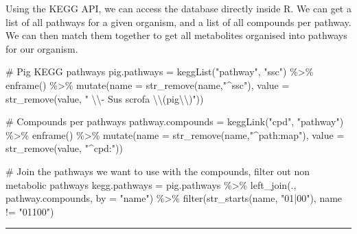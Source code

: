 \documentclass[
  24px,
  letterpaper,
  DIV=11,
  numbers=noendperiod]{scrartcl}
\newenvironment{Shaded}{\begin{snugshade}}{\end{snugshade}}
\newcommand{\AttributeTok}[1]{\textcolor[rgb]{0.40,0.45,0.13}{#1}}
\newcommand{\CommentTok}[1]{\textcolor[rgb]{0.37,0.37,0.37}{#1}}
\newcommand{\FunctionTok}[1]{\textcolor[rgb]{0.28,0.35,0.67}{#1}}
\newcommand{\NormalTok}[1]{\textcolor[rgb]{0.00,0.23,0.31}{#1}}
\newcommand{\OtherTok}[1]{\textcolor[rgb]{0.00,0.23,0.31}{#1}}
\newcommand{\SpecialCharTok}[1]{\textcolor[rgb]{0.37,0.37,0.37}{#1}}
\newcommand{\StringTok}[1]{\textcolor[rgb]{0.13,0.47,0.30}{#1}}
\begin{document}
Using the KEGG API, we can access the database directly inside R. We can
get a list of all pathways for a given organism, and a list of all
compounds per pathway. We can then match them together to get all
metabolites organised into pathways for our organism.

\begin{Shaded}
\begin{Highlighting}[]
\CommentTok{\# Pig KEGG pathways}
\NormalTok{pig.pathways }\OtherTok{=} \FunctionTok{keggList}\NormalTok{(}\StringTok{"pathway"}\NormalTok{, }\StringTok{"ssc"}\NormalTok{) }\SpecialCharTok{\%\textgreater{}\%} 
  \FunctionTok{enframe}\NormalTok{() }\SpecialCharTok{\%\textgreater{}\%} 
  \FunctionTok{mutate}\NormalTok{(}\AttributeTok{name =} \FunctionTok{str\_remove}\NormalTok{(name,}\StringTok{"\^{}ssc"}\NormalTok{), }
         \AttributeTok{value =} \FunctionTok{str\_remove}\NormalTok{(value, }\StringTok{" }\SpecialCharTok{\textbackslash{}\textbackslash{}}\StringTok{{-} Sus scrofa }\SpecialCharTok{\textbackslash{}\textbackslash{}}\StringTok{(pig}\SpecialCharTok{\textbackslash{}\textbackslash{}}\StringTok{)"}\NormalTok{)) }

\CommentTok{\# Compounds per pathways}
\NormalTok{pathway.compounds }\OtherTok{=} \FunctionTok{keggLink}\NormalTok{(}\StringTok{"cpd"}\NormalTok{, }\StringTok{"pathway"}\NormalTok{) }\SpecialCharTok{\%\textgreater{}\%} 
  \FunctionTok{enframe}\NormalTok{() }\SpecialCharTok{\%\textgreater{}\%} 
  \FunctionTok{mutate}\NormalTok{(}\AttributeTok{name =} \FunctionTok{str\_remove}\NormalTok{(name,}\StringTok{"\^{}path:map"}\NormalTok{), }
         \AttributeTok{value =} \FunctionTok{str\_remove}\NormalTok{(value, }\StringTok{"\^{}cpd:"}\NormalTok{))}

\CommentTok{\# Join the pathways we want to use with the compounds, filter out non metabolic pathways}
\NormalTok{kegg.pathways }\OtherTok{=}\NormalTok{ pig.pathways }\SpecialCharTok{\%\textgreater{}\%} 
  \FunctionTok{left\_join}\NormalTok{(., pathway.compounds, }\AttributeTok{by =} \StringTok{"name"}\NormalTok{) }\SpecialCharTok{\%\textgreater{}\%} 
  \FunctionTok{filter}\NormalTok{(}\FunctionTok{str\_starts}\NormalTok{(name, }\StringTok{"01|00"}\NormalTok{), }
\NormalTok{         name }\SpecialCharTok{!=} \StringTok{"01100"}\NormalTok{)}
\end{Highlighting}
\end{Shaded}

\begin{center}\rule{0.5\linewidth}{0.5pt}\end{center}
\end{document}
